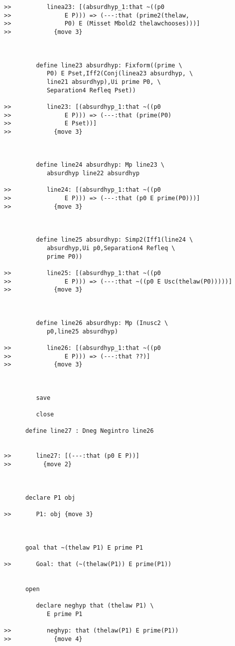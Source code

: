 \documentclass[12pt]{article}
\begin{document}
\begin{verbatim}
>>          linea23: [(absurdhyp_1:that ~((p0
>>               E P))) => (---:that (prime2(thelaw,
>>               P0) E (Misset Mbold2 thelawchooses)))]
>>            {move 3}



         define line23 absurdhyp: Fixform((prime \
            P0) E Pset,Iff2(Conj(linea23 absurdhyp, \
            line21 absurdhyp),Ui prime P0, \
            Separation4 Refleq Pset))

>>          line23: [(absurdhyp_1:that ~((p0
>>               E P))) => (---:that (prime(P0)
>>               E Pset))]
>>            {move 3}



         define line24 absurdhyp: Mp line23 \
            absurdhyp line22 absurdhyp

>>          line24: [(absurdhyp_1:that ~((p0
>>               E P))) => (---:that (p0 E prime(P0)))]
>>            {move 3}



         define line25 absurdhyp: Simp2(Iff1(line24 \
            absurdhyp,Ui p0,Separation4 Refleq \
            prime P0))

>>          line25: [(absurdhyp_1:that ~((p0
>>               E P))) => (---:that ~((p0 E Usc(thelaw(P0)))))]
>>            {move 3}



         define line26 absurdhyp: Mp (Inusc2 \
            p0,line25 absurdhyp)

>>          line26: [(absurdhyp_1:that ~((p0
>>               E P))) => (---:that ??)]
>>            {move 3}



         save

         close

      define line27 : Dneg Negintro line26


>>       line27: [(---:that (p0 E P))]
>>         {move 2}



      declare P1 obj

>>       P1: obj {move 3}



      goal that ~(thelaw P1) E prime P1

>>       Goal: that (~(thelaw(P1)) E prime(P1))


      open

         declare neghyp that (thelaw P1) \
            E prime P1

>>          neghyp: that (thelaw(P1) E prime(P1))
>>            {move 4}




\end{verbatim}
\end{document}
